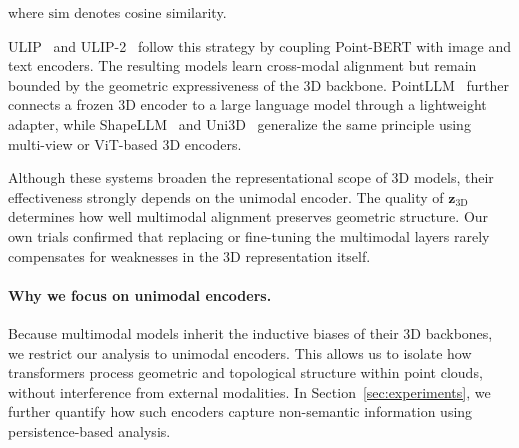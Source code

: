 where $\text{sim}$ denotes cosine similarity.

ULIP~\cite{ulip} and ULIP-2~\cite{ulip2} follow this strategy by coupling Point-BERT with image and text encoders. The resulting models learn cross-modal alignment but remain bounded by the geometric expressiveness of the 3D backbone. PointLLM~\cite{pointllm} further connects a frozen 3D encoder to a large language model through a lightweight adapter, while ShapeLLM~\cite{shapellm} and Uni3D~\cite{uni3d} generalize the same principle using multi-view or ViT-based 3D encoders.

Although these systems broaden the representational scope of 3D models, their effectiveness strongly depends on the unimodal encoder. The quality of $\mathbf{z}_{\text{3D}}$ determines how well multimodal alignment preserves geometric structure. Our own trials confirmed that replacing or fine-tuning the multimodal layers rarely compensates for weaknesses in the 3D representation itself.

\paragraph{Why we focus on unimodal encoders.}
Because multimodal models inherit the inductive biases of their 3D backbones, we restrict our analysis to unimodal encoders. This allows us to isolate how transformers process geometric and topological structure within point clouds, without interference from external modalities. In Section~\ref{sec:experiments}, we further quantify how such encoders capture non-semantic information using persistence-based analysis.



